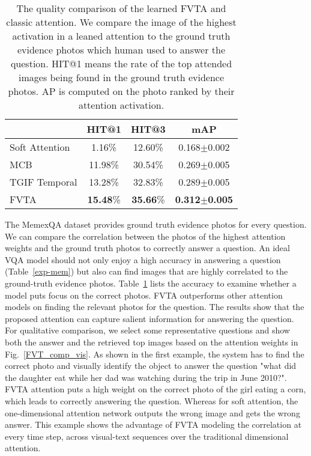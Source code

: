 \begin{table}[ht]
\centering
\begin{tabular}{l||c|c|c}
\hline
               & HIT@1 & HIT@3 & mAP \\ \hline \hline
Soft Attention    & 1.16\%         & 12.60\% & 0.168$\pm$0.002                      \\
MCB    & 11.98\%         & 30.54\% & 0.269$\pm$0.005                      \\
TGIF Temporal    & 13.28\%         & 32.83\% & 0.289$\pm$0.005                      \\
FVTA & \textbf{15.48}\%          & \textbf{35.66}\%    & \textbf{0.312$\pm$0.005}                  \\
\hline
\end{tabular}
\vspace{1mm}
\caption{The quality comparison of the learned FVTA and classic attention. We compare the image of the highest activation in a leaned attention to the ground truth evidence photos which human used to answer the question. HIT@1 means the rate of the top attended images being found in the ground truth evidence photos. AP is computed on the photo ranked by their attention activation.}
\label{att-acc}
\vspace{-3mm}
\end{table}



The MemexQA dataset provides ground truth evidence photos for every question. We can compare the correlation between the photos of the highest attention weights and the ground truth photos to correctly answer a question. An ideal VQA model should not only enjoy a high accuracy in answering a question (Table~\ref{exp-mem}) but also can find images that are highly correlated to the ground-truth evidence photos. Table~\ref{att-acc} lists the accuracy to examine whether a model puts focus on the correct photos. FVTA outperforms other attention models on finding the relevant photos for the question. The results show that the proposed attention can capture salient information for answering the question. For qualitative comparison, we select some representative questions and show both the answer and the retrieved top images based on the attention weights in Fig.~\ref{FVT_comp_vis}. 
As shown in the first example, the system has to find the correct photo and visually identify the object to answer the question "what did the daughter eat while her dad was watching during the trip in June 2010?". FVTA attention puts a high weight on the correct photo of the girl eating a corn, which leads to correctly answering the question. Whereas for soft attention, the one-dimensional attention network outputs the wrong image and gets the wrong answer.
This example shows the advantage of FVTA modeling the correlation at every time step, across visual-text sequences over the traditional dimensional attention. 


